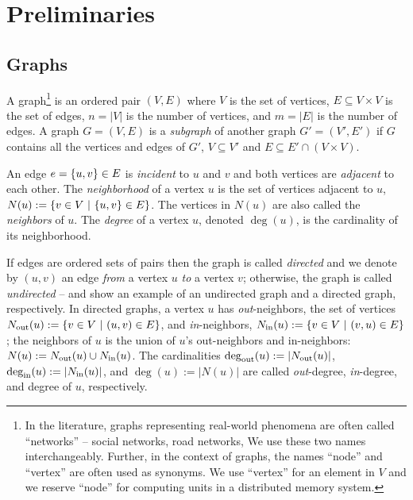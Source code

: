 \chapter{Preliminaries}

\section{Graphs}
\label{sec:prelim-graphs}
A graph\footnote{In the literature, graphs representing real-world phenomena
are often called \enquote{networks} -- \eg social networks, road networks,
\etc We use these two names interchangeably. Further, in the context of
graphs, the names \enquote{node} and \enquote{vertex} are often used
as synonyms. We use \enquote{vertex} for an element in $V$ and we reserve
\enquote{node} for computing units in a distributed memory system.} is an ordered
pair $(V, E)$ where $V$ is the set of vertices, $E \subseteq V\times V$ is the
set of edges, $n = |V|$ is the number of vertices, and $m = |E|$ is the number
of edges.
A graph $G = (V, E)$ is a \emph{subgraph} of another graph $G' = (V', E')$ if
$G$ contains all the vertices and edges of $G'$, \ie
$V \subseteq V'$ and $E \subseteq E' \cap (V \times V)$.

An edge $e = \set{u, v} \in E$ is
\emph{incident} to $u$ and $v$ and both vertices are \emph{adjacent} to
each other.
The \emph{neighborhood} of a vertex $u$ is the set of
vertices adjacent to $u$, \ie $N(u) := \set{v \in V\ |\ \set{u, v} \in E}$. The
vertices in $N(u)$ are also called the \emph{neighbors} of $u$. The
\emph{degree} of a vertex $u$, denoted $\deg(u)$, is the cardinality of its
neighborhood.

\sloppy
If edges are ordered sets of pairs then the graph is called \emph{directed}
and we denote by $(u, v)$ an edge \emph{from} a vertex $u$ \emph{to} a vertex $v$;
otherwise, the graph is called \emph{undirected} -- 
and  show an example of an undirected graph
and a directed graph, respectively.
In directed graphs, a vertex $u$ has \emph{out}-neighbors, \ie the set of
vertices $\nout(u) := \set{v\in V\ |\ (u, v) \in E}$, and \emph{in}-neighbors, \ie
$\nin(u) := \set{v\in V\ |\ (v, u) \in E}$; the neighbors of $u$ is the union of $u$'s
out-neighbors and in-neighbors: $N(u) := N_{\text{out}}(u) \cup N_{\text{in}}(u)$.
The cardinalities $\deg_{\text{out}}(u) :=
|N_{\text{out}}(u)|$, $\deg_{\text{in}}(u) := |N_{\text{in}}(u)|$, and $\deg(u) := |N(u)|$ are called
\emph{out}-degree, \emph{in}-degree, and degree of $u$, respectively.


